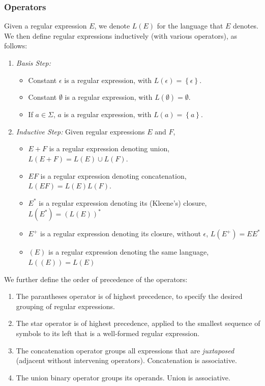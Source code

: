 \subsubsection{Operators}
Given a regular expression $E$, we denote $L(E)$ for the language that $E$
denotes. We then define regular expressions inductively (with various
operators), as follows:
\begin{enumerate}
  \item \textit{Basis Step:}
    \begin{itemize}
      \item Constant $\epsilon$ is a regular expression, with
        $L(\epsilon)=\left\{ \epsilon \right\}$.
      \item Constant $\emptyset$ is a regular expression, with $L(\emptyset)=\emptyset$.
      \item If $a\in \Sigma$, $a$ is a regular expression, with $L(a)=\left\{ a
        \right\}$.
    \end{itemize}
  \item \textit{Inductive Step:} Given regular expressions $E$ and $F$,
    \begin{itemize}
      \item $E+F$ is a regular expression denoting union, $L(E+F)=L(E)\cup L(F)$.
      \item $EF$ is a regular expression denoting concatenation, $L(EF)=L(E)L(F)$.
      \item  $E^{*}$ is a regular expression denoting its (Kleene's) closure,
        $L(E^{*})={\left( L\left( E \right)  \right)}^{*}$
      \item $E^{+}$ is a regular expression denoting its closure, without $\epsilon$, $L(E^{+})=EE^{*}$
      \item $(E)$ is a regular expression denoting the same language, $L\left( \left( E \right)  \right) =L(E)$
    \end{itemize}
\end{enumerate}
We further define the order of precedence of the operators:
 \begin{enumerate}
  \item The parantheses operator is of highest precedence, to specify the
    desired grouping of regular expressions.
  \item The star operator is of highest precedence, applied to the smallest
    sequence of symbols to its left that is a well-formed regular expression.
  \item The concatenation operator groups all expressions that are
    \textit{juxtaposed} (adjacent without intervening operators). Concatenation is associative.
  \item The union binary operator groups its operands. Union is associative.
\end{enumerate}


